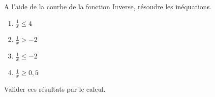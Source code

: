 
A l'aide de la courbe de la fonction Inverse, résoudre les inéquations.
\begin{enumerate}
\item $\frac{1}{x} \leq 4$
\item $\frac{1}{x} > -2$
\item $\frac{1}{x} \leq -2$
\item $\frac{1}{x} \geq 0,5 $
\end{enumerate}
Valider ces résultats par le calcul.